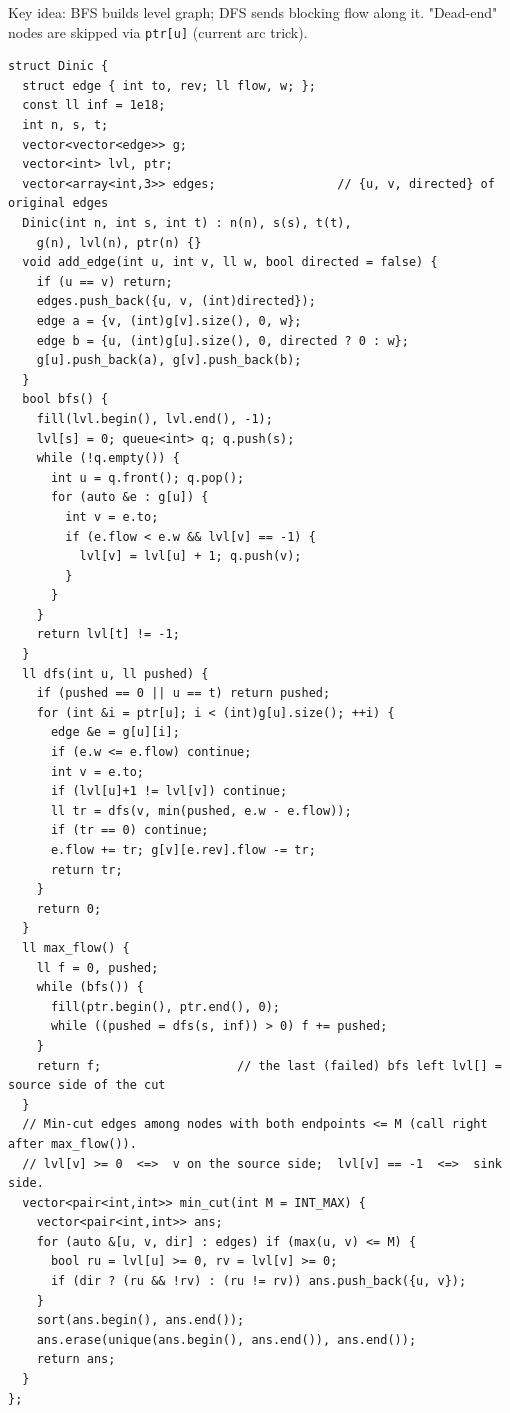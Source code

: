 Key idea: BFS builds level graph; DFS sends blocking flow along it. "Dead-end" nodes are skipped via \texttt{ptr[u]} (current arc trick).
\begin{verbatim}
struct Dinic {
  struct edge { int to, rev; ll flow, w; };
  const ll inf = 1e18;
  int n, s, t;
  vector<vector<edge>> g;
  vector<int> lvl, ptr;
  vector<array<int,3>> edges;                 // {u, v, directed} of original edges
  Dinic(int n, int s, int t) : n(n), s(s), t(t), 
    g(n), lvl(n), ptr(n) {}
  void add_edge(int u, int v, ll w, bool directed = false) {
    if (u == v) return;
    edges.push_back({u, v, (int)directed});
    edge a = {v, (int)g[v].size(), 0, w};
    edge b = {u, (int)g[u].size(), 0, directed ? 0 : w};
    g[u].push_back(a), g[v].push_back(b);
  }
  bool bfs() {
    fill(lvl.begin(), lvl.end(), -1);
    lvl[s] = 0; queue<int> q; q.push(s);
    while (!q.empty()) {
      int u = q.front(); q.pop();
      for (auto &e : g[u]) {
        int v = e.to;
        if (e.flow < e.w && lvl[v] == -1) {
          lvl[v] = lvl[u] + 1; q.push(v);
        }
      }
    }
    return lvl[t] != -1;
  }
  ll dfs(int u, ll pushed) {
    if (pushed == 0 || u == t) return pushed;
    for (int &i = ptr[u]; i < (int)g[u].size(); ++i) {
      edge &e = g[u][i];
      if (e.w <= e.flow) continue;
      int v = e.to;
      if (lvl[u]+1 != lvl[v]) continue;
      ll tr = dfs(v, min(pushed, e.w - e.flow));
      if (tr == 0) continue;
      e.flow += tr; g[v][e.rev].flow -= tr;
      return tr;
    }
    return 0;
  }
  ll max_flow() {
    ll f = 0, pushed;
    while (bfs()) {
      fill(ptr.begin(), ptr.end(), 0);
      while ((pushed = dfs(s, inf)) > 0) f += pushed;
    }
    return f;                   // the last (failed) bfs left lvl[] = source side of the cut
  }
  // Min-cut edges among nodes with both endpoints <= M (call right after max_flow()).
  // lvl[v] >= 0  <=>  v on the source side;  lvl[v] == -1  <=>  sink side.
  vector<pair<int,int>> min_cut(int M = INT_MAX) {
    vector<pair<int,int>> ans;
    for (auto &[u, v, dir] : edges) if (max(u, v) <= M) {
      bool ru = lvl[u] >= 0, rv = lvl[v] >= 0;
      if (dir ? (ru && !rv) : (ru != rv)) ans.push_back({u, v});
    }
    sort(ans.begin(), ans.end());
    ans.erase(unique(ans.begin(), ans.end()), ans.end());
    return ans;
  }
};
\end{verbatim}
